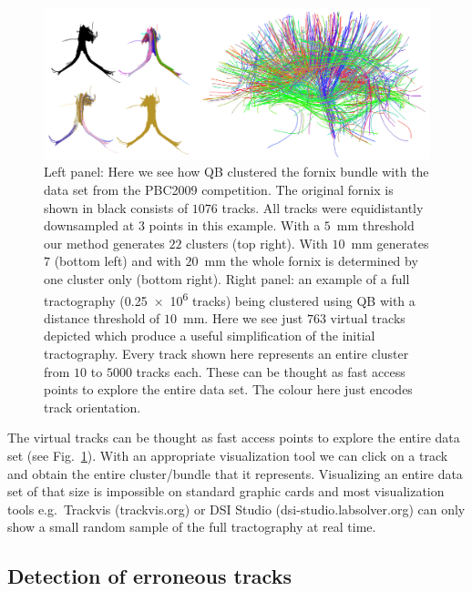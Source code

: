 \documentclass[preprint,authoryear,a4paper,10pt,onecolumn]{elsarticle}
\begin{document}
\begin{figure}
\begin{centering}
\includegraphics[scale=0.6]{last_figures/LSC_simple}
\par\end{centering}
\caption{Left panel: Here we see how QB clustered the fornix bundle with the
  data set from the PBC2009 competition. The original fornix is shown in
  black consists of $1076$ tracks. All tracks were equidistantly
  downsampled at $3$ points in this example. With a $5$~mm threshold our
  method generates $22$ clusters (top right). With $10$~mm generates $7$
  (bottom left) and with $20$~mm the whole fornix is determined by one
  cluster only (bottom right). Right panel: an example of a full tractography
  (\num{0.25e6} tracks) being clustered using QB with a distance threshold
  of $10$~mm. Here we see just $763$ virtual tracks depicted which
  produce a useful simplification of the initial tractography. Every
  track shown here represents an entire cluster from $10$ to $5000$
  tracks each. These can be thought as fast access points to explore the
  entire data set. The colour here just encodes track
  orientation.\label{Flo:QB_fornix}}
\centering{}
\end{figure}

The virtual tracks can be thought as fast access points to explore the
entire data set (see Fig.~\ref{Flo:QB_fornix}). With an appropriate
visualization tool we can click on a track and obtain the entire
cluster/bundle that it represents. Visualizing an entire data set of
that size is impossible on standard graphic cards and most visualization
tools e.g.~Trackvis (trackvis.org) or DSI Studio
(dsi-studio.labsolver.org) can only show a small random sample of
the full tractography at real time.

\subsection{Detection of erroneous tracks\label{sub:erroneous}}
\end{document}
